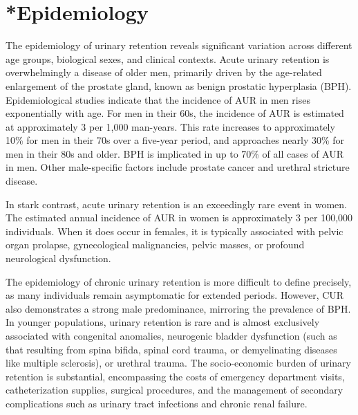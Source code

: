 \section{*{Epidemiology}}
The epidemiology of urinary retention reveals significant variation across different age groups, biological sexes, and clinical contexts. Acute urinary retention is overwhelmingly a disease of older men, primarily driven by the age-related enlargement of the prostate gland, known as benign prostatic hyperplasia (BPH). Epidemiological studies indicate that the incidence of AUR in men rises exponentially with age. For men in their 60s, the incidence of AUR is estimated at approximately 3 per 1,000 man-years. This rate increases to approximately 10\% for men in their 70s over a five-year period, and approaches nearly 30\% for men in their 80s and older. BPH is implicated in up to 70\% of all cases of AUR in men. Other male-specific factors include prostate cancer and urethral stricture disease.

In stark contrast, acute urinary retention is an exceedingly rare event in women. The estimated annual incidence of AUR in women is approximately 3 per 100,000 individuals. When it does occur in females, it is typically associated with pelvic organ prolapse, gynecological malignancies, pelvic masses, or profound neurological dysfunction.

The epidemiology of chronic urinary retention is more difficult to define precisely, as many individuals remain asymptomatic for extended periods. However, CUR also demonstrates a strong male predominance, mirroring the prevalence of BPH. In younger populations, urinary retention is rare and is almost exclusively associated with congenital anomalies, neurogenic bladder dysfunction (such as that resulting from spina bifida, spinal cord trauma, or demyelinating diseases like multiple sclerosis), or urethral trauma. The socio-economic burden of urinary retention is substantial, encompassing the costs of emergency department visits, catheterization supplies, surgical procedures, and the management of secondary complications such as urinary tract infections and chronic renal failure.

